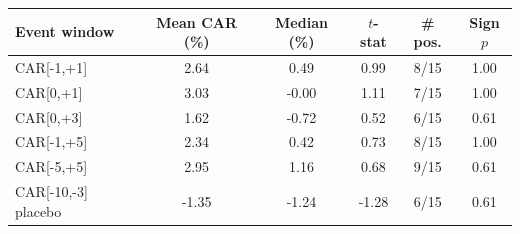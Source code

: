 \begin{tabular}{lccccc}
\toprule
Event window & Mean CAR (\%) & Median (\%) & $t$-stat & \# pos. & Sign $p$ \\
\midrule
{CAR[-1,+1]} & 2.64 & 0.49 & 0.99 & 8/15 & 1.00 \\
{CAR[0,+1]} & 3.03 & -0.00 & 1.11 & 7/15 & 1.00 \\
{CAR[0,+3]} & 1.62 & -0.72 & 0.52 & 6/15 & 0.61 \\
{CAR[-1,+5]} & 2.34 & 0.42 & 0.73 & 8/15 & 1.00 \\
{CAR[-5,+5]} & 2.95 & 1.16 & 0.68 & 9/15 & 0.61 \\
{CAR[-10,-3] placebo} & -1.35 & -1.24 & -1.28 & 6/15 & 0.61 \\
\bottomrule
\end{tabular}